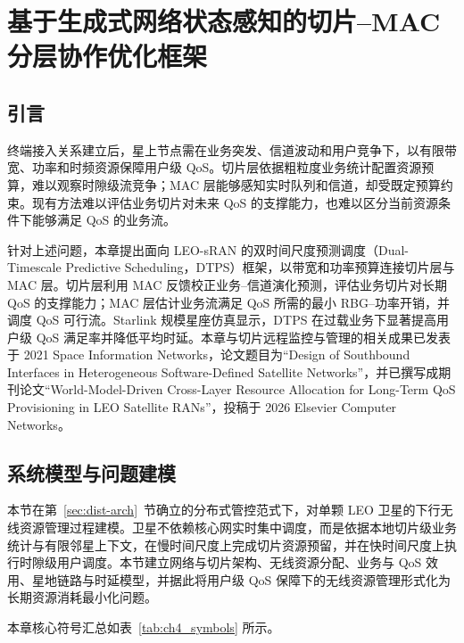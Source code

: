 \chapter{基于生成式网络状态感知的切片--MAC 分层协作优化框架}
\label{chap:resource}

\section{引言}

终端接入关系建立后，星上节点需在业务突发、信道波动和用户竞争下，以有限带宽、功率和时频资源保障用户级 QoS。切片层依据粗粒度业务统计配置资源预算，难以观察时隙级流竞争；MAC 层能够感知实时队列和信道，却受既定预算约束。现有方法难以评估业务切片对未来 QoS 的支撑能力，也难以区分当前资源条件下能够满足 QoS 的业务流。

针对上述问题，本章提出面向 LEO-sRAN 的双时间尺度预测调度（Dual-Timescale Predictive Scheduling，DTPS）框架，以带宽和功率预算连接切片层与 MAC 层。切片层利用 MAC 反馈校正业务--信道演化预测，评估业务切片对长期 QoS 的支撑能力；MAC 层估计业务流满足 QoS 所需的最小 RBG--功率开销，并调度 QoS 可行流。Starlink 规模星座仿真显示，DTPS 在过载业务下显著提高用户级 QoS 满足率并降低平均时延。本章与切片远程监控与管理的相关成果已发表于 2021 Space Information Networks，论文题目为``Design of Southbound Interfaces in Heterogeneous Software-Defined Satellite Networks''\cite{lxp-southbound}，并已撰写成期刊论文``World-Model-Driven Cross-Layer Resource Allocation for Long-Term QoS Provisioning in LEO Satellite RANs''，投稿于 2026 Elsevier Computer Networks。

\section{系统模型与问题建模}
\label{sec:ch4_sysmodel}

本节在第~\ref{sec:dist-arch}~节确立的分布式管控范式下，对单颗 LEO 卫星的下行无线资源管理过程建模。卫星不依赖核心网实时集中调度，而是依据本地切片级业务统计与有限邻星上下文，在慢时间尺度上完成切片资源预留，并在快时间尺度上执行时隙级用户调度。本节建立网络与切片架构、无线资源分配、业务与 QoS 效用、星地链路与时延模型，并据此将用户级 QoS 保障下的无线资源管理形式化为长期资源消耗最小化问题。

本章核心符号汇总如表~\ref{tab:ch4_symbols} 所示。

